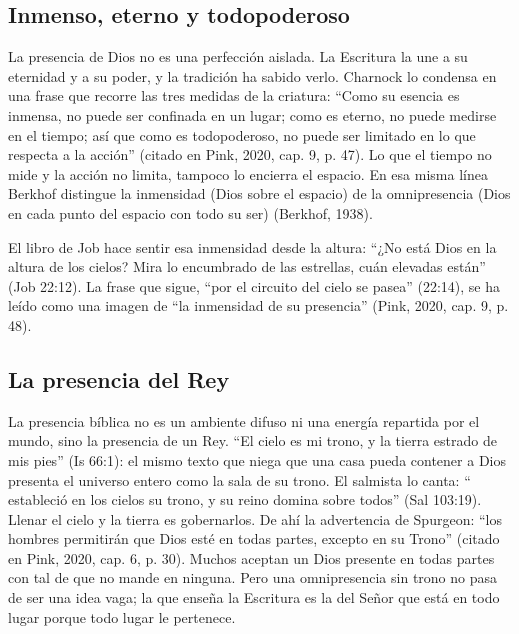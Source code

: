 \subsection{Inmenso, eterno y todopoderoso}

La presencia de Dios no es una perfección aislada. La Escritura la une a su eternidad y a su poder, y la tradición ha sabido verlo. Charnock lo condensa en una frase que recorre las tres medidas de la criatura: ``Como su esencia es inmensa, no puede ser confinada en un lugar; como es eterno, no puede medirse en el tiempo; así que como es todopoderoso, no puede ser limitado en lo que respecta a la acción'' (citado en Pink, 2020, cap. 9, p. 47). Lo que el tiempo no mide y la acción no limita, tampoco lo encierra el espacio. En esa misma línea Berkhof distingue la inmensidad (Dios sobre el espacio) de la omnipresencia (Dios en cada punto del espacio con todo su ser) (Berkhof, 1938).

El libro de Job hace sentir esa inmensidad desde la altura: ``¿No está Dios en la altura de los cielos? Mira lo encumbrado de las estrellas, cuán elevadas están'' (Job 22:12). La frase que sigue, ``por el circuito del cielo se pasea'' (22:14), se ha leído como una imagen de ``la inmensidad de su presencia'' (Pink, 2020, cap. 9, p. 48).


\subsection{La presencia del Rey}

La presencia bíblica no es un ambiente difuso ni una energía repartida por el mundo, sino la presencia de un Rey. ``El cielo es mi trono, y la tierra estrado de mis pies'' (Is 66:1): el mismo texto que niega que una casa pueda contener a Dios presenta el universo entero como la sala de su trono. El salmista lo canta: ``\SENOR{} estableció en los cielos su trono, y su reino domina sobre todos'' (Sal 103:19). Llenar el cielo y la tierra es gobernarlos. De ahí la advertencia de Spurgeon: ``los hombres permitirán que Dios esté en todas partes, excepto en su Trono'' (citado en Pink, 2020, cap. 6, p. 30). Muchos aceptan un Dios presente en todas partes con tal de que no mande en ninguna. Pero una omnipresencia sin trono no pasa de ser una idea vaga; la que enseña la Escritura es la del Señor que está en todo lugar porque todo lugar le pertenece.

